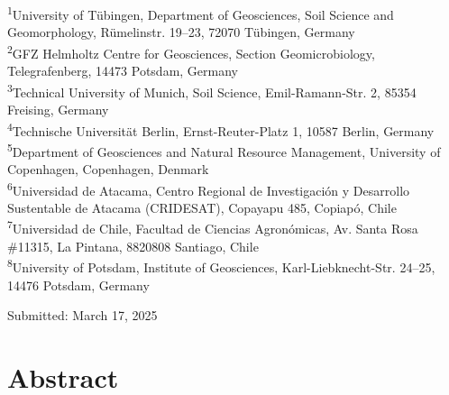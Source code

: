 \begin{scriptsize}
  \begin{justify}
    \textsuperscript{1}University of T{\"u}bingen, Department of Geosciences, Soil Science and Geomorphology, R{\"u}melinstr. 19--23, 72070 T{\"u}bingen, Germany\\
    \textsuperscript{2}GFZ Helmholtz Centre for Geosciences, Section Geomicrobiology, Telegrafenberg, 14473 Potsdam, Germany\\
    \textsuperscript{3}Technical University of Munich, Soil Science, Emil-Ramann-Str. 2, 85354 Freising, Germany\\
    \textsuperscript{4}Technische Universit{\"a}t Berlin, Ernst-Reuter-Platz 1, 10587 Berlin, Germany\\
    \textsuperscript{5}Department of Geosciences and Natural Resource Management, University of Copenhagen, Copenhagen, Denmark\\
    \textsuperscript{6}Universidad de Atacama, Centro Regional de Investigaci{\'o}n y Desarrollo Sustentable de Atacama (CRIDESAT), Copayapu 485, Copiap{\'o}, Chile\\
    \textsuperscript{7}Universidad de Chile, Facultad de Ciencias Agron{\'o}micas, Av. Santa Rosa \#11315, La Pintana, 8820808 Santiago, Chile \\
    \textsuperscript{8}University of Potsdam, Institute of Geosciences, Karl-Liebknecht-Str. 24--25, 14476 Potsdam, Germany
  \end{justify}
\end{scriptsize}
  
\vspace{0.4cm}

\begin{flushleft}
  Submitted: March 17, 2025\\
\end{flushleft}

\cleardoublepage

\section*{Abstract} %

